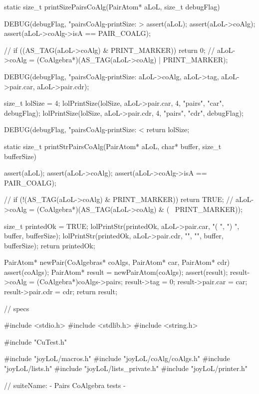 static size_t printSizePairsCoAlg(PairAtom* aLoL, size_t debugFlag) {
  DEBUG(debugFlag, "pairsCoAlg-printSize: > %
  assert(aLoL);
  assert(aLoL->coAlg);
  assert(aLoL->coAlg->isA == PAIR_COALG);

//  if ((AS_TAG(aLoL->coAlg) & PRINT_MARKER)) return 0;
//  aLoL->coAlg = (CoAlgebra*)(AS_TAG(aLoL->coAlg) | PRINT_MARKER);

  DEBUG(debugFlag, "pairsCoAlg-printSize: %
        aLoL->coAlg, aLoL->tag, aLoL->pair.car, aLoL->pair.cdr);

  size_t lolSize = 4;
  lolPrintSize(lolSize, aLoL->pair.car, 4, "pairs", "car", debugFlag);
  lolPrintSize(lolSize, aLoL->pair.cdr, 4, "pairs", "cdr", debugFlag);

  DEBUG(debugFlag, "pairsCoAlg-printSize: < %
  return lolSize;
}

static size_t printStrPairsCoAlg(PairAtom* aLoL,
                                 char* buffer, size_t bufferSize) {
  assert(aLoL);
  assert(aLoL->coAlg);
  assert(aLoL->coAlg->isA == PAIR_COALG);

//  if (!(AS_TAG(aLoL->coAlg) & PRINT_MARKER)) return TRUE;
//  aLoL->coAlg = (CoAlgebra*)(AS_TAG(aLoL->coAlg) & (~ PRINT_MARKER));

  size_t printedOk = TRUE;
  lolPrintStr(printedOk, aLoL->pair.car, "( ", ") ", buffer, bufferSize);
  lolPrintStr(printedOk, aLoL->pair.cdr, "", "", buffer, bufferSize);
  return printedOk;
}

PairAtom* newPair(CoAlgebras* coAlgs, PairAtom* car, PairAtom* cdr) {
  assert(coAlgs);
  PairAtom* result = newPairAtom(coAlgs);
  assert(result);
  result->coAlg    = (CoAlgebra*)coAlgs->pairs;
  result->tag      = 0;
  result->pair.car = car;
  result->pair.cdr = cdr;
  return result;
}


\stoptyping

\starttyping
// specs

#include <stdio.h>
#include <stdlib.h>
#include <string.h>

#include "CuTest.h"

#include "joyLoL/macros.h"
#include "joyLoL/coAlg/coAlgs.h"
#include "joyLoL/lists.h"
#include "joyLoL/lists_private.h"
#include "joyLoL/printer.h"

// suiteName: - Pairs CoAlgebra tests -

